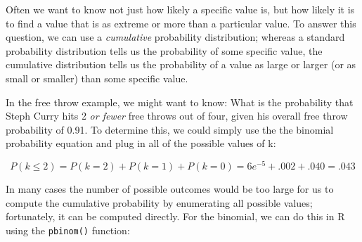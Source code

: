 \documentclass[]{book}
\newenvironment{Shaded}{\begin{snugshade}}{\end{snugshade}}
\newcommand{\KeywordTok}[1]{\textcolor[rgb]{0.13,0.29,0.53}{\textbf{#1}}}
\newcommand{\DataTypeTok}[1]{\textcolor[rgb]{0.13,0.29,0.53}{#1}}
\newcommand{\DecValTok}[1]{\textcolor[rgb]{0.00,0.00,0.81}{#1}}
\newcommand{\FloatTok}[1]{\textcolor[rgb]{0.00,0.00,0.81}{#1}}
\newcommand{\StringTok}[1]{\textcolor[rgb]{0.31,0.60,0.02}{#1}}
\newcommand{\CommentTok}[1]{\textcolor[rgb]{0.56,0.35,0.01}{\textit{#1}}}
\newcommand{\OperatorTok}[1]{\textcolor[rgb]{0.81,0.36,0.00}{\textbf{#1}}}
\newcommand{\NormalTok}[1]{#1}
\theoremstyle{definition}
\theoremstyle{definition}
\theoremstyle{definition}
\theoremstyle{remark}
\begin{document}
Often we want to know not just how likely a specific value is, but how
likely it is to find a value that is as extreme or more than a
particular value. To answer this question, we can use a
\emph{cumulative} probability distribution; whereas a standard
probability distribution tells us the probability of some specific
value, the cumulative distribution tells us the probability of a value
as large or larger (or as small or smaller) than some specific value.

In the free throw example, we might want to know: What is the
probability that Steph Curry hits 2 \emph{or fewer} free throws out of
four, given his overall free throw probability of 0.91. To determine
this, we could simply use the the binomial probability equation and plug
in all of the possible values of k:

\[
P(k\le2)= P(k=2) + P(k=1) + P(k=0) = 6e^{-5} + .002 + .040 = .043  
\]

In many cases the number of possible outcomes would be too large for us
to compute the cumulative probability by enumerating all possible
values; fortunately, it can be computed directly. For the binomial, we
can do this in R using the \texttt{pbinom()} function:

\begin{Shaded}
\end{Shaded}
\end{document}

